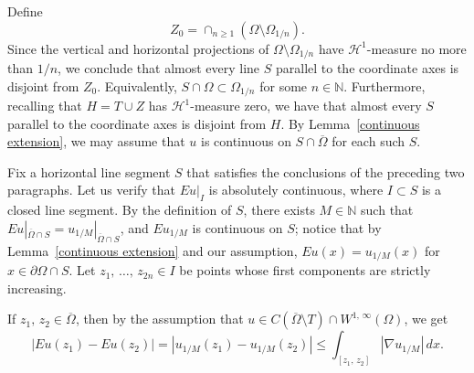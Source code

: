 \documentclass[reqno,11pt]{amsart}
\def\ch{{\mathcal H}}
\def\ez{\epsilon}
\numberwithin{equation}{section}
\theoremstyle{remark}
\begin{document}
Define 
$$Z_0=\cap_{n\ge 1} \left(\Omega\setminus \Omega_{1/ n}\right).$$
Since the vertical and horizontal projections of  $\Omega\setminus \Omega_{1/n}$ have $\ch^1$-measure no more than $1/ n$, we conclude that almost every line $S$ parallel to the coordinate axes is disjoint from $Z_0$. Equivalently, $S\cap \Omega\subset \Omega_{1/ n}$ for some $n\in \mathbb N$. Furthermore, recalling that $H=T\cup Z$ has $\ch^1$-measure zero, we have that almost every $S$ parallel to  the coordinate axes is disjoint from $H$. By Lemma~\ref{continuous extension}, we may assume that $u$ is continuous on $S\cap \overline{\Omega}$ for each such $S$. 



Fix a horizontal line segment $S$ that satisfies the conclusions of the preceding two paragraphs. Let us  verify that $Eu|_{I}$ is absolutely continuous, where $I\subset S$ is a closed line segment.  
By the definition of $S$, there exists $M\in \mathbb N$ such that $Eu|_{\overline{\Omega}\cap S}=u_{1/M}|_{\overline{\Omega}\cap S}$, and $Eu_{1/M}$ is continuous on $S$; notice that by Lemma~\ref{continuous extension} and our assumption, $Eu(x)=u_{1/M}(x)$ for $x\in \partial \Omega\cap S$. Let $z_1,\,\dots,\,z_{2n}\in I$ be points whose 
first components are strictly increasing. 


If $z_1,\,z_2\in \overline{\Omega}$, then by the assumption that $u\in C(\overline{\Omega}\setminus T)\cap W^{1,\,\infty}(\Omega)$, we get
\[
|Eu(z_1)-Eu(z_2)| = |u_{1/M}(z_1)-u_{1/M}(z_2)| \le \int_{[z_1,\,z_2]} |\nabla u_{1/M}|\,dx. 
\]
\end{document}
